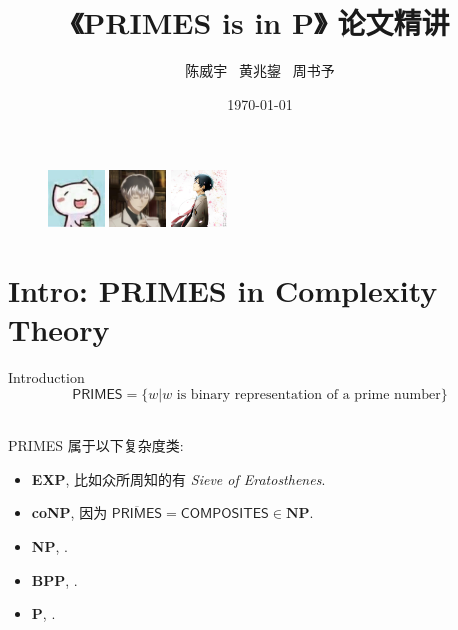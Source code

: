 \documentclass{beamer}
\author{陈威宇 \ 黄兆鋆 \ 周书予}
\title{《\textsf{PRIMES} is in \textbf{P}》 论文精讲}
\institute{信息科学技术学院}
\date{\today}
\begin{document}
\begin{frame}
    \titlepage
    \begin{figure}[htpb]
        \begin{center}
            \includegraphics[width=1.5cm]{cwy.jpg} \qquad
            \includegraphics[width=1.5cm]{hzj.jpg} \qquad
            \includegraphics[width=1.5cm]{zsy.jpg}
        \end{center}
    \end{figure}
\end{frame}


\section{Intro: PRIMES in Complexity Theory}
\begin{frame}{Introduction}
	$$\mathsf{PRIMES} = \{w | w \text{ is binary representation of a prime number}\}$$

	~\\

	\textsf{PRIMES} 属于以下复杂度类:
	\begin{itemize}
		\item \textbf{EXP}, 比如众所周知的有 \textit{Sieve of Eratosthenes}.
		\item \textbf{coNP}, 因为 $\overline{\textsf{PRIMES}} = \textsf{COMPOSITES} \in \textbf{NP}$.
		\item \textbf{NP}, \cite{Pratt75}.
		\item \textbf{BPP}, \cite{AB99}.
		\item \textbf{P}, \cite{AKS02}.
	\end{itemize}

\end{frame}
\end{document}
